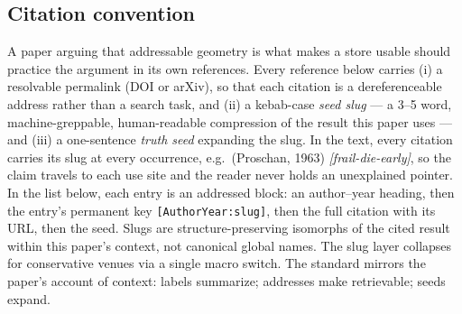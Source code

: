 \documentclass[11pt]{article}
\theoremstyle{remark}
\begin{document}
\subsection*{Citation convention}
A paper arguing that addressable geometry is what makes a store usable should
practice the argument in its own references. Every reference below carries (i) a resolvable permalink (DOI or arXiv), so
that each citation is a dereferenceable address rather than a search task, and
(ii) a kebab-case \emph{seed slug} --- a 3--5 word, machine-greppable,
human-readable compression of the result this paper uses --- and (iii) a
one-sentence \emph{truth seed} expanding the slug. In the text, every citation
carries its slug at every occurrence, e.g.\ (Proschan, 1963)
\textit{[frail-die-early]}, so the claim travels to each use site and the
reader never holds an unexplained pointer. In the list below, each entry is an
addressed block: an author--year heading, then the entry's permanent key
\texttt{[AuthorYear:slug]}, then the full citation with its URL, then the
seed. Slugs are structure-preserving
isomorphs of the cited result within this paper's context, not canonical
global names. The slug layer collapses for conservative venues via a single
macro switch. The standard mirrors the paper's account of context: labels
summarize; addresses make retrievable; seeds expand.
\end{document}
